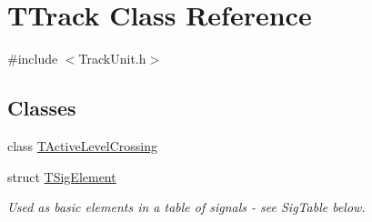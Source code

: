 \hypertarget{class_t_track}{}\section{T\+Track Class Reference}
\label{class_t_track}


{\ttfamily \#include $<$Track\+Unit.\+h$>$}

\subsection*{Classes}
\begin{DoxyCompactItemize}
\item 
class \mbox{\hyperlink{class_t_track_1_1_t_active_level_crossing}{T\+Active\+Level\+Crossing}}
\item 
struct \mbox{\hyperlink{struct_t_track_1_1_t_sig_element}{T\+Sig\+Element}}
\begin{DoxyCompactList}\small\item\em Used as basic elements in a table of signals -\/ see Sig\+Table below. \end{DoxyCompactList}\end{DoxyCompactItemize}
